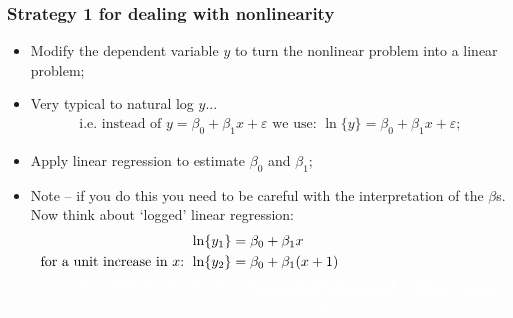 \documentclass[aspectratio=169]{beamer}
\theoremstyle{principle}
\begin{document}
\begin{frame}
\frametitle{Strategy 1 for dealing with nonlinearity}

\begin{itemize}
\item Modify the dependent variable $y$ to turn the nonlinear problem into a linear problem;
\item Very typical to natural log $y$...
\begin{align*}
\mbox{i.e. instead of }y = \beta_0 + \beta_1x + \varepsilon\mbox{ we use: }\ln\{y\} = \beta_0 + \beta_1x + \varepsilon;
\end{align*}
\item Apply linear regression to estimate $\beta_0$ and $\beta_1$;
\item Note -- if you do this you need to be careful with the interpretation of the $\beta$s.  Now think about `logged' linear regression:
\begin{align*}
\ln\{y_1\} &= \beta_0 + \beta_1x\\
\mbox{for a unit increase in $x$: } \ln\{y_2\} &= \beta_0 + \beta_1(x + 1)\color{white} = \beta_0 + \beta_1x + \beta_1\\
\color{white}\mbox{so change in $y$ is: }y_2 - y_1 &\color{white}= \underbrace{\exp\{\beta_1\}\exp\{\beta_0 + \beta_1x)\}}_{y_2} - \underbrace{\exp\{\beta_0 + \beta_1x\}}_{y_1}
\end{align*}

\end{itemize}

\end{frame}
\end{document}
